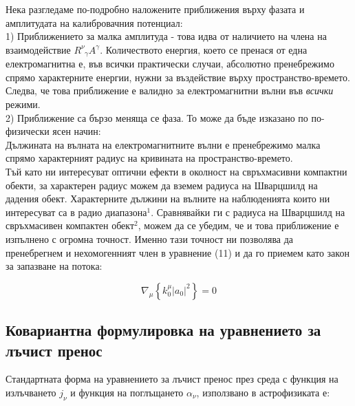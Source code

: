 Нека разгледаме по-подробно наложените приближения върху фазата и амплитудата на калибровачния потенциал:\\

1) Приближението за малка амплитуда - това идва от наличието на члена на взаимодействие $R^\nu_{\,\,\,\gamma} A^\gamma$. Количеството енергия, което се пренася от една електромагнитна е, във всички практически случаи, абсолютно пренебрежимо спрямо характерните енергии, нужни за въздействие върху пространство-времето. Следва, че това приближение е валидно за електромагнитни вълни във \emph{всички} режими.\\

2) Приближение са бързо меняща се фаза. То може да бъде изказано по по-физически ясен начин:\\

Дължината на вълната на електромагнитните вълни е пренебрежимо малка спрямо характерният радиус на кривината на пространство-времето.\\

Тъй като ни интересуват оптични ефекти в околност на свръхмасивни компактни обекти, за характерен радиус можем да вземем радиуса на Шварцшилд на дадения обект. Характерните дължини на вълните на наблюденията които ни интересуват са в радио диапазона$^1$. Сравнявайки ги с радиуса на Шварцшилд на свръхмасивен компактен обект$^2$, можем да се убедим, че и това приближение е изпълнено с огромна точност. Именно тази точност ни позволява да пренебрегнем и нехомогенният член в уравнение (11) и да го приемем като закон за запазване на потока:

\begin{equation}
		\nabla_\mu\left\{k_0^\mu |a_0|^2\right\} = 0
\end{equation}

\newpage
\lfoot{}
\subsection{Ковариантна формулировка на уравнението за лъчист пренос}

Стандартната форма на уравнението за лъчист пренос през среда с функция на излъчването $j_\nu$ и функция на поглъщането $\alpha_\nu$, използвано в астрофизиката е:

